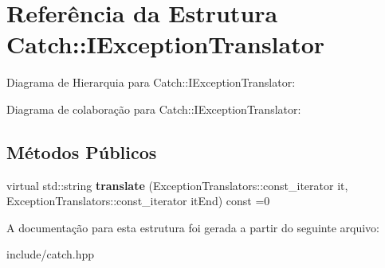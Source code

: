 \hypertarget{structCatch_1_1IExceptionTranslator}{}\section{Referência da Estrutura Catch\+:\+:I\+Exception\+Translator}
\label{structCatch_1_1IExceptionTranslator}


Diagrama de Hierarquia para Catch\+:\+:I\+Exception\+Translator\+:


Diagrama de colaboração para Catch\+:\+:I\+Exception\+Translator\+:
\subsection*{Métodos Públicos}
\begin{DoxyCompactItemize}
\item 
virtual std\+::string {\bfseries translate} (Exception\+Translators\+::const\+\_\+iterator it, Exception\+Translators\+::const\+\_\+iterator it\+End) const =0\hypertarget{structCatch_1_1IExceptionTranslator_a2a554b96ed5ed411e7c796b6b42837a5}{}\label{structCatch_1_1IExceptionTranslator_a2a554b96ed5ed411e7c796b6b42837a5}

\end{DoxyCompactItemize}


A documentação para esta estrutura foi gerada a partir do seguinte arquivo\+:\begin{DoxyCompactItemize}
\item 
include/catch.\+hpp\end{DoxyCompactItemize}
